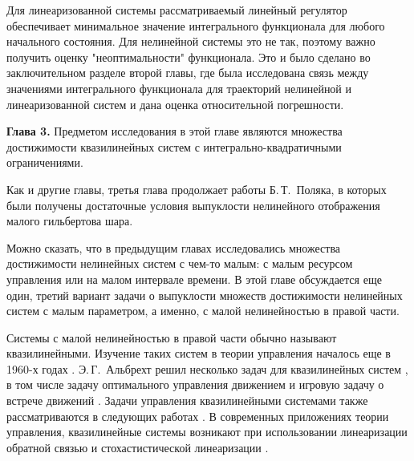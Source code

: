 \documentclass[../main.tex]{subfiles}
\begin{document}
Для линеаризованной системы рассматриваемый линейный регулятор обеспечивает минимальное значение интегрального функционала для любого начального состояния. 
Для нелинейной системы это не так, поэтому важно получить оценку "неоптимальности" функционала. 
Это и было сделано во заключительном разделе второй главы, где была исследована связь между значениями интегрального функционала для траекторий нелинейной и линеаризованной систем и дана оценка относительной погрешности. 

\textbf{Глава 3. }
Предметом исследования в этой главе являются множества достижимости квазилинейных систем с интегрально-квадратичными ограничениями.

Как и другие главы, третья глава продолжает работы Б.\,Т.~Поляка\cite{Polyak2001}, в которых были получены достаточные условия выпуклости нелинейного отображения малого гильбертова шара.

Можно сказать, что в предыдущим главах исследовались множества достижимости нелинейных систем с чем-то малым: с малым ресурсом управления или на малом интервале времени.
В этой главе обсуждается еще один, третий вариант задачи о выпуклости множеств достижимости нелинейных систем с малым параметром, а именно, с малой нелинейностью в правой части. 

Системы с малой нелинейностью в правой части обычно называют квазилинейными. 
Изучение таких систем в теории управления началось еще в 1960-х годах \cite{Subbotin, Kiselev, Kras_book}.
Э.\,Г.~Альбрехт решил несколько задач для квазилинейных систем \cite{Albrecht3}, в том числе задачу оптимального управления движением \cite{Albrecht1} и игровую задачу о встрече движений \cite{Albrecht2}.
Задачи управления квазилинейными системами также рассматриваются в следующих работах \cite{Dauer, Kremlev, KalininLavrinovich2018, Gabasov}.
В современных приложениях теории управления, квазилинейные системы возникают при использовании линеаризации обратной связью и стохастистической линеаризации \cite{Ching, Gui}.
\end{document}
